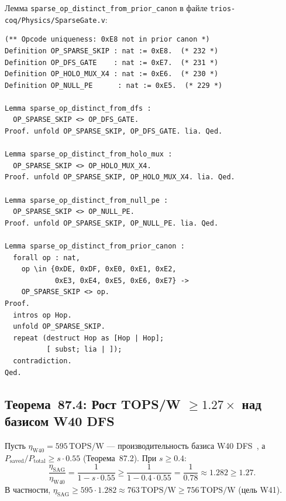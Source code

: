 \begin{remark}
Лемма \texttt{sparse\_op\_distinct\_from\_prior\_canon} в файле
\texttt{trios-coq/Physics/SparseGate.v}:
\begin{lstlisting}[language=Coq,
  caption={Coq-лемма об уникальности опкода 0xE8},
  label={lst:coq-opcode}]
(** Opcode uniqueness: 0xE8 not in prior canon *)
Definition OP_SPARSE_SKIP : nat := 0xE8.  (* 232 *)
Definition OP_DFS_GATE    : nat := 0xE7.  (* 231 *)
Definition OP_HOLO_MUX_X4 : nat := 0xE6.  (* 230 *)
Definition OP_NULL_PE      : nat := 0xE5.  (* 229 *)

Lemma sparse_op_distinct_from_dfs :
  OP_SPARSE_SKIP <> OP_DFS_GATE.
Proof. unfold OP_SPARSE_SKIP, OP_DFS_GATE. lia. Qed.

Lemma sparse_op_distinct_from_holo_mux :
  OP_SPARSE_SKIP <> OP_HOLO_MUX_X4.
Proof. unfold OP_SPARSE_SKIP, OP_HOLO_MUX_X4. lia. Qed.

Lemma sparse_op_distinct_from_null_pe :
  OP_SPARSE_SKIP <> OP_NULL_PE.
Proof. unfold OP_SPARSE_SKIP, OP_NULL_PE. lia. Qed.

Lemma sparse_op_distinct_from_prior_canon :
  forall op : nat,
    op \in {0xDE, 0xDF, 0xE0, 0xE1, 0xE2,
            0xE3, 0xE4, 0xE5, 0xE6, 0xE7} ->
    OP_SPARSE_SKIP <> op.
Proof.
  intros op Hop.
  unfold OP_SPARSE_SKIP.
  repeat (destruct Hop as [Hop | Hop];
          [ subst; lia | ]);
  contradiction.
Qed.
\end{lstlisting}
\end{remark}


\subsection{Теорема~87.4: Рост TOPS/W $\geq 1{.}27\times$ над базисом W40 DFS}
\label{ssec:thm87-4}

\begin{theorem}
\label{thm:tops-w}
Пусть $\eta_{\mathrm{W40}} = 595\,\text{TOPS/W}$ — производительность
базиса W40 DFS~\cite{trios895}, а $P_{\mathrm{saved}} / P_{\mathrm{total}}
\geq s \cdot 0{.}55$ (Теорема~87.2).  При $s \geq 0{.}4$:
\begin{equation}
  \frac{\eta_{\mathrm{SAG}}}{\eta_{\mathrm{W40}}}
  = \frac{1}{1 - s \cdot 0{.}55}
  \geq \frac{1}{1 - 0{.}4 \cdot 0{.}55}
  = \frac{1}{0{.}78}
  \approx 1{.}282 \geq 1{.}27.
  \label{eq:thm-tops-w}
\end{equation}
В частности, $\eta_{\mathrm{SAG}} \geq 595 \cdot 1{.}282 \approx
763\,\text{TOPS/W} \geq 756\,\text{TOPS/W}$ (цель W41).
\end{theorem}

